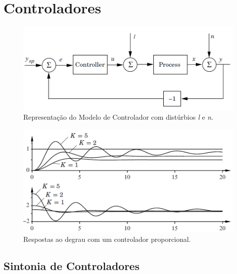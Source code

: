 \section{Controladores}

\begin{figure}[htb]
  \caption{Representação do Modelo de Controlador com distúrbios \textit{l} e \textit{n}.}
  \begin{center}
      \includegraphics[scale=0.65]{img/feedback_loop_astrom_p65}
  \end{center}
  \label{fig:feedback_loop_astrom_p65}
\end{figure}

\begin{figure}[htb]
  \caption{Respostas ao degrau com um controlador proporcional.}
  \begin{center}
      \includegraphics[scale=0.65]{img/proportional_astrom_p66}
  \end{center}
  \label{fig:proportional_astrom_p66}
\end{figure}

\subsection{Sintonia de Controladores}


